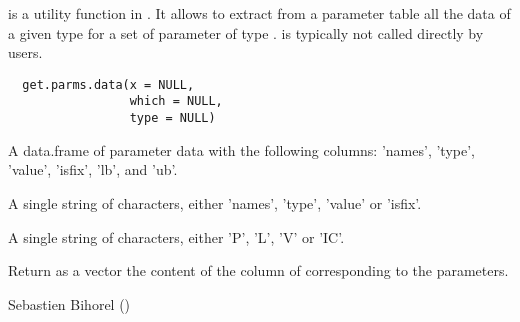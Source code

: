 %
\begin{Description}\relax
{} is a utility function in . It allows to 
extract from a parameter table  all the data of a given type
 for a set of parameter of type . 
is typically not called directly by users.
\end{Description}
%
\begin{Usage}
\begin{verbatim}
  get.parms.data(x = NULL,
                 which = NULL,
                 type = NULL)
\end{verbatim}
\end{Usage}
%
\begin{Arguments}
\begin{ldescription}
\item[\code{x}] A data.frame of parameter data with the following columns: 'names', 
'type', 'value', 'isfix', 'lb', and 'ub'.
\item[\code{which}] A single string of characters, either 'names', 'type', 'value' or
'isfix'.
\item[\code{type}] A single string of characters, either 'P', 'L', 'V' or 'IC'.
\end{ldescription}
\end{Arguments}
%
\begin{Value}
Return as a vector the content of the  column of  
corresponding to the  parameters.
\end{Value}
%
\begin{Author}\relax
Sebastien Bihorel ()
\end{Author}
